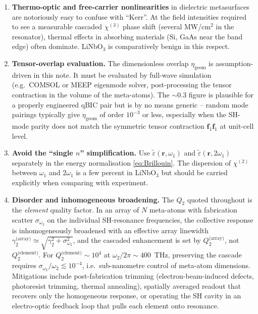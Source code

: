 \documentclass[11pt,a4paper]{article}
\newcommand{\epstilde}{\widetilde{\varepsilon}}
\newcommand{\bvec}[1]{\mathbf{#1}}
\newcommand{\f}{\bvec{f}}
\newcommand{\ri}{\bvec{r}}
\newcommand{\chitwo}{\chi^{(2)}}
\newcommand{\chithree}{\chi^{(3)}}
\begin{document}
\begin{enumerate}
  \item \textbf{Thermo-optic and free-carrier nonlinearities} in
        dielectric metasurfaces are notoriously easy to confuse with
        ``Kerr''.  At the field intensities required to see a
        measurable cascaded $\chithree$ phase shift (several
        MW/cm$^{2}$ in the resonator), thermal effects in absorbing
        materials (Si, GaAs near the band edge) often dominate.
        LiNbO$_3$ is comparatively benign in this respect.

  \item \textbf{Tensor-overlap evaluation.} The dimensionless overlap
        $\eta_\text{geom}$ is assumption-driven in this note.  It must
        be evaluated by full-wave simulation (e.g.\ COMSOL or MEEP
        eigenmode solver, post-processing the tensor contraction in
        the volume of the meta-atoms).  The $\sim 0.3$ figure is
        plausible for a properly engineered qBIC pair but is by no
        means generic -- random mode pairings typically give
        $\eta_\text{geom}$ of order $10^{-3}$ or less, especially when
        the SH-mode parity does not match the symmetric tensor
        contraction $\f_1\f_1$ at unit-cell level.

  \item \textbf{Avoid the ``single $n$'' simplification.} Use
        $\epstilde(\ri,\omega_1)$ and $\epstilde(\ri,2\omega_1)$
        separately in the energy normalisation \eqref{eq:Brillouin}.
        The dispersion of $\chitwo$ between $\omega_1$ and $2\omega_1$
        is a few percent in LiNbO$_3$ but should be carried explicitly
        when comparing with experiment.

  \item \textbf{Disorder and inhomogeneous broadening.}  The $Q_2$
        quoted throughout is the \emph{element} quality factor.  In an
        array of $N$ meta-atoms with fabrication scatter
        $\sigma_{\omega_2}$ on the individual SH-resonance frequencies,
        the collective response is inhomogeneously broadened with an
        effective array linewidth
        $\gamma_2^\text{(array)}\!\simeq\!\sqrt{\gamma_2^{2}+\sigma_{\omega_2}^{2}}$,
        and the cascaded enhancement is set by $Q_2^\text{(array)}$,
        not $Q_2^\text{(element)}$.  For $Q_2^\text{(element)}\sim
        10^{4}$ at $\omega_2/2\pi\!\sim\!400$~THz, preserving the
        cascade requires $\sigma_{\omega_2}/\omega_2\lesssim 10^{-4}$,
        i.e.\ sub-nanometre control of meta-atom dimensions.  Mitigations
        include post-fabrication trimming (electron-beam-induced
        defects, photoresist trimming, thermal annealing), spatially
        averaged readout that recovers only the homogeneous response,
        or operating the SH cavity in an electro-optic feedback loop
        that pulls each element onto resonance.
\end{enumerate}
\end{document}

